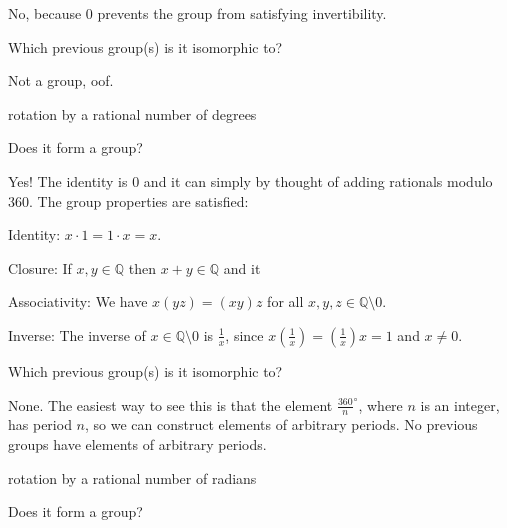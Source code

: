 \documentclass[../key.tex]{subfiles}
\begin{document}
\noindent No, because $0$ prevents the group from satisfying invertibility.

\begin{iinner_problem}
\item Which previous group(s) is it isomorphic to?
\end{iinner_problem}

\noindent Not a group, oof.

\begin{inner_problem}
\item rotation by a rational number of degrees
\end{inner_problem}

\begin{iinner_problem}[start=1]
\item Does it form a group?
\end{iinner_problem}

\noindent Yes! The identity is $0$ and it can simply by thought of adding rationals modulo $360$. The group properties are satisfied:

Identity: $x\cdot 1=1\cdot x=x$.

Closure: If $x,y\in\mathbb{Q}$ then $x+y\in \mathbb{Q}$ and it

Associativity: We have $x(yz)=(xy)z$ for all $x,y,z \in \mathbb{Q} \setminus {0}$.

Inverse: The inverse of $x\in \mathbb{Q} \setminus {0}$ is $\frac{1}{x}$, since $x\left(\frac{1}{x}\right)=\left(\frac{1}{x}\right)x=1$ and $x\neq 0$.

\begin{iinner_problem}
\item Which previous group(s) is it isomorphic to?
\end{iinner_problem}

\noindent None. The easiest way to see this is that the element $\frac{360}{n}^\circ$, where $n$ is an integer, has period $n$, so we can construct elements of arbitrary periods. No previous groups have elements of arbitrary periods.

\begin{inner_problem}
\item rotation by a rational number of radians
\end{inner_problem}

\begin{iinner_problem}[start=1]
\item Does it form a group?
\end{iinner_problem}
\end{document}

